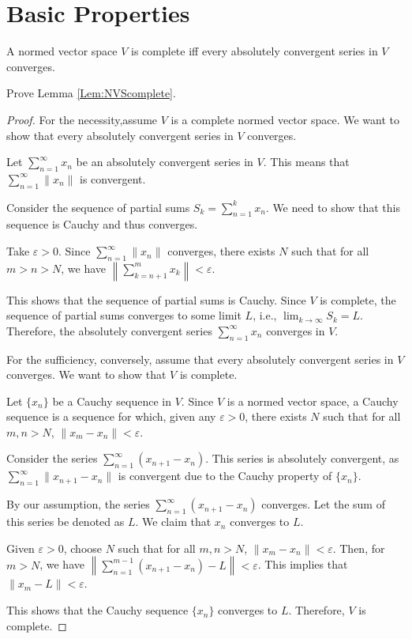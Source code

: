 \section{Basic Properties}
\begin{lem}
    \label{Lem:NVScomplete}
    A normed vector space $V$ is complete iff every absolutely 
    convergent series in $V$ converges. 
\end{lem}
\begin{exc}
    Prove Lemma \ref{Lem:NVScomplete}.
\end{exc}
\begin{proof}
    For the necessity,assume $V$ is a complete normed vector space. 
    We want to show that every absolutely convergent series 
    in $V$ converges.

    Let $\sum_{n=1}^{\infty} x_n$ be an absolutely convergent 
    series in $V$. This means that $\sum_{n=1}^{\infty} 
    \|x_n\|$ is convergent.

    Consider the sequence of partial sums 
    $S_k = \sum_{n=1}^{k} x_n$. We need to show that this 
    sequence is Cauchy and thus converges.

    Take $\varepsilon > 0$. Since $\sum_{n=1}^{\infty} 
    \|x_n\|$ converges, there exists $N$ such that for 
    all $m > n > N$, we have $\left\|\sum_{k=n+1}^{m} 
    x_k\right\| < \varepsilon$.

    This shows that the sequence of partial sums is Cauchy. 
    Since $V$ is complete, the sequence of partial sums 
    converges to some limit $L$, i.e., $\lim_{k \to \infty} 
    S_k = L$. Therefore, the absolutely convergent series 
    $\sum_{n=1}^{\infty} x_n$ converges in $V$.


    For the sufficiency, conversely, assume that every 
    absolutely convergent series in $V$ converges. We want 
    to show that $V$ is complete.

    Let $\{x_n\}$ be a Cauchy sequence in $V$. Since $V$ is a 
    normed vector space, a Cauchy sequence is a sequence for 
    which, given any $\varepsilon > 0$, there exists $N$ such 
    that for all $m,n > N$, $\|x_m - x_n\| < \varepsilon$.

    Consider the series $\sum_{n=1}^{\infty} (x_{n+1} - x_n)$. 
    This series is absolutely convergent, as 
    $\sum_{n=1}^{\infty} \|x_{n+1} - x_n\|$ is convergent due 
    to the Cauchy property of $\{x_n\}$.

    By our assumption, the series $\sum_{n=1}^{\infty} (x_{n+1} - x_n)$ 
    converges. Let the sum of this series be denoted as $L$. 
    We claim that $x_n$ converges to $L$.

    Given $\varepsilon > 0$, choose $N$ such that for all 
    $m,n > N$, $\|x_m - x_n\| < \varepsilon$. Then, for 
    $m > N$, we have $\left\|\sum_{n=1}^{m-1} (x_{n+1} - x_n) 
    - L\right\| < \varepsilon$. This implies that 
    $\|x_m - L\| < \varepsilon$.

    This shows that the Cauchy sequence $\{x_n\}$ converges 
    to $L$. Therefore, $V$ is complete.
\end{proof}
